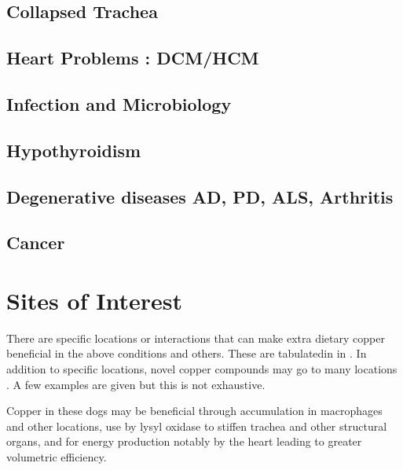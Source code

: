  \mjmdistab

\subsection{ Collapsed Trachea }

\mjmcollapse

\subsection{ Heart Problems : DCM/HCM}

\mjmdcm

\subsection{ Infection and Microbiology  }

\mjminfect

\subsection{ Hypothyroidism  }

\mjmthy

\subsection{ Degenerative diseases AD, PD, ALS, Arthritis  }

\mjmmisc

\subsection{ Cancer }

\mjmcancer

\section{ Sites of Interest }

There are specific locations or interactions
that can make extra dietary copper beneficial
in the above conditions and others.
These are  tabulatedin in .
In addition to specific locations, novel
copper compounds may go to many locations
. A  few examples are given  but this is not
exhaustive. 


Copper in these dogs may be beneficial through accumulation
in macrophages and other locations, use by lysyl oxidase to
stiffen trachea and other structural organs, and for
energy production notably by the heart leading to greater
volumetric efficiency. 

